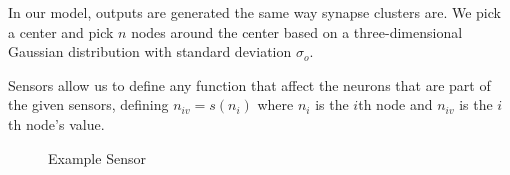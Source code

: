 \documentclass[12pt]{article}
\begin{document}
In our model, outputs are generated the same way synapse clusters are.  We pick a center and pick $n$ nodes around the center based on a three-dimensional Gaussian distribution with standard deviation $\sigma_o$.

Sensors allow us to define any function that affect the neurons that are part of the given sensors, defining $n_{iv} = s(n_i)$ where $n_i$ is the $i$th node and $n_{iv}$ is the $i$th node's value.

\begin{figure}[H]
    \centering
    \caption{Example Sensor} \label{fig:Sensor}
\end{figure}
\end{document}
